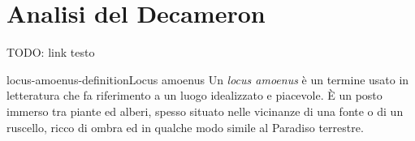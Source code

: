 \documentclass[preview]{standalone}
\begin{document}
\genpage

\section{Analisi del Decameron}

\begin{plainhtml}
    TODO: link testo
\end{plainhtml}

\begin{snippetdefinition}{locus-amoenus-definition}{Locus amoenus}
    Un \textit{locus amoenus} è un termine usato in letteratura
    che fa riferimento a un luogo idealizzato e piacevole.
    È un posto immerso tra piante ed alberi,
    spesso situato nelle vicinanze di una fonte o di un ruscello,
    ricco di ombra ed in qualche modo simile al Paradiso terrestre. 
\end{snippetdefinition}
\end{document}
